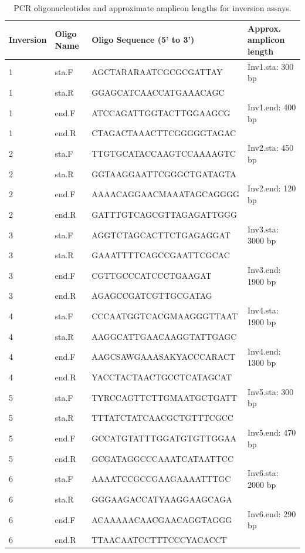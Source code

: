 \begin{table}[ht]
\centering
\begin{tabular}{llll}
\hline
\textbf{Inversion} & \textbf{Oligo Name} & \textbf{Oligo Sequence (5' to 3')} & \textbf{Approx. amplicon length} \\
\hline

1 & sta.F & AGCTARARAATCGCGCGATTAY & Inv1.sta: 300 bp \\
1 & sta.R & GGAGCATCAACCATGAAACAGC & \\
1 & end.F & ATCCAGATTGGTACTTGGAAGCG & Inv1.end: 400 bp \\
1 & end.R & CTAGACTAAACTTCGGGGGTAGAC & \\
\hline

2 & sta.F & TTGTGCATACCAAGTCCAAAAGTC & Inv2.sta: 450 bp \\
2 & sta.R & GGTAAGGAATTCGGGCTGATAGTA & \\
2 & end.F & AAAACAGGAACMAAATAGCAGGGG & Inv2.end: 120 bp \\
2 & end.R & GATTTGTCAGCGTTAGAGATTGGG & \\
\hline

3 & sta.F & AGGTCTAGCACTTCTGAGAGGAT & Inv3.sta: 3000 bp \\
3 & sta.R & GAAATTTTCAGCCGAATTCGCAC & \\
3 & end.F & CGTTGCCCATCCCTGAAGAT & Inv3.end: 1900 bp \\
3 & end.R & AGAGCCGATCGTTGCGATAG & \\
\hline

4 & sta.F & CCCAATGGTCACGMAAGGGTTAAT & Inv4.sta: 1900 bp \\
4 & sta.R & AAGGCATTGAACAAGGTATTGAGC & \\
4 & end.F & AAGCSAWGAAASAKYACCCARACT & Inv4.end: 1300 bp \\
4 & end.R & YACCTACTAACTGCCTCATAGCAT & \\
\hline

5 & sta.F & TYRCCAGTTCTTGMAATGCTGATT & Inv5.sta: 300 bp \\
5 & sta.R & TTTATCTATCAACGCTGTTTCGCC & \\
5 & end.F & GCCATGTATTTGGATGTGTTGGAA & Inv5.end: 470 bp \\
5 & end.R & GCGATAGGCCCAAATCATAATTCC & \\
\hline

6 & sta.F & AAAATCCGCCGAAGAAAATTTGC & Inv6.sta: 2000 bp \\
6 & sta.R & GGGAAGACCATYAAGGAAGCAGA & \\
6 & end.F & ACAAAAACAACGAACAGGTAGGG & Inv6.end: 290 bp \\
6 & end.R & TTAACAATCCTTTCCCYACACCT & \\
\hline

\end{tabular}
\caption{PCR oligonucleotides and approximate amplicon lengths for inversion assays.}
\label{tab:inversion_primers}
\end{table}
